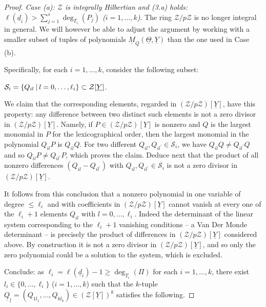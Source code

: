 \documentclass[11pt,a4paper,reqno]{amsart}
\theoremstyle{definition}
\begin{document}
\begin{proof}
\noindent
\emph{Case {\rm (a)}: ${\mathcal Z}$ is  integrally Hilbertian and \hbox{\rm (3.a)} holds: $\ell({\underline d}_i) > \sum_{j=1}^s \deg_{T_i}(P_j)$ ($i=1,\ldots,k$)}. The ring ${\mathcal Z}/p{\mathcal Z}$ is no longer integral in general. We will however be able to adjust the argument by working with a smaller subset of tuples of polynomials $\underline M_{\underline Q}(\underline{\Theta},\underline Y)$
than the one used in Case (b).

Specifically, for each $i=1,\ldots,k$, consider the following subset:
\vskip 1mm

\centerline{${\mathcal S}_i=\{ Q_{il} \hskip 2pt | \hskip 2pt  l=0,\ldots,\ell_i\} \subset {\mathcal Z}[\underline Y]$.}

\vskip 1mm

\noindent
We claim that the corresponding elements, regarded in $({\mathcal Z}/p{\mathcal Z})[\underline Y]$, have this property: any difference between two distinct such elements is not a zero divisor in $({\mathcal Z}/p{\mathcal Z})[\underline Y]$. Namely, if $P\in ({\mathcal Z}/p{\mathcal Z})[\underline Y]$ is nonzero and $Q$ is the largest monomial in $P$ for the lexicographical order, then the largest monomial in  the polynomial $Q_{il} P$ is $Q_{il} Q$. For two different $Q_{il}, Q_{i l^\prime} \in {\mathcal S}_i$, we have $Q_{il} Q\not= Q_{i l^\prime} Q$ and so $Q_{il} P\not= Q_{i l^\prime} P$, which proves the claim. Deduce next that the product of all nonzero differences $(Q_{il}- Q_{i l^\prime})$ with $Q_{il}, Q_{i l^\prime} \in {\mathcal S}_i$ is not a zero divisor in $({\mathcal Z}/p{\mathcal Z})[\underline Y]$.


 It follows from this conclusion that a nonzero polynomial in one variable of degree $\leq \ell_i$ and with coefficients in $({\mathcal Z}/p{\mathcal Z})[\underline Y]$ cannot vanish at every one of the $\ell_i+1$ elements $Q_{il}$ with $ l=0,\ldots,\ell_i$. Indeed the determinant of the linear system corresponding to the $\ell_i+1$ vanishing conditions -- a Van Der Monde determinant -- is precisely the product of differences in $({\mathcal Z}/p{\mathcal Z})[\underline Y]$ considered above. By construction it is not a zero divisor in $({\mathcal Z}/p{\mathcal Z})[\underline Y]$, and so only the zero polynomial could be a  solution to the system, which is excluded.

 
Conclude: as $\ell_i=\ell(\underline d_i) - 1 \geq \deg_{T_i}(\Pi)$ for each $i=1,\ldots,k$, there exist $l_i\in \{0,\ldots,\ell_i\}$ ($i=1,\ldots,k$) such that the $k$-tuple $\underline Q_{\underline l}=(Q_{1l_1},\ldots,Q_{kl_k}) \in ({\mathcal Z}[\underline Y])^k$ satisfies the following.
\vskip 1mm


\end{proof}
\end{document}
